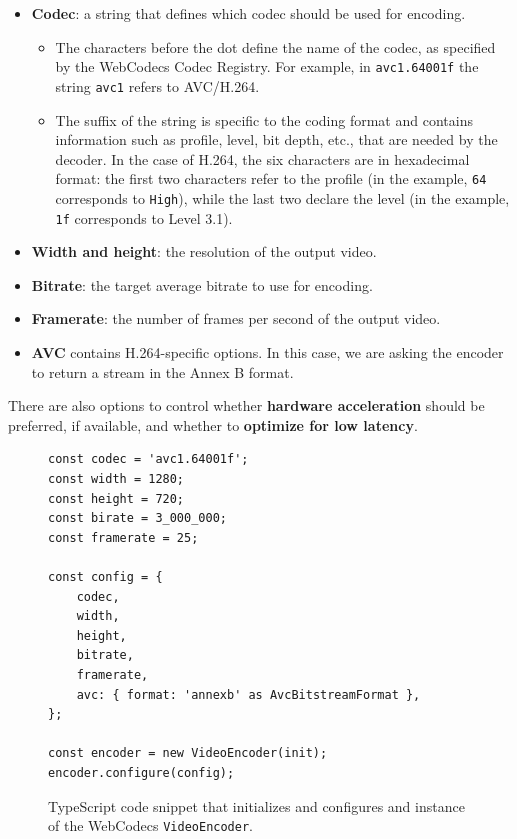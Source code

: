 \begin{itemize}
    \item \textbf{Codec}: a string that defines which codec should be used for encoding.
    \begin{itemize}
        \item The characters before the dot define the name of the codec, as specified by the WebCodecs Codec Registry.\cite{webcodecs_registry} For example, in \texttt{avc1.64001f} the string \texttt{avc1} refers to AVC/H.264.
        \item The suffix of the string is specific to the coding format and contains information such as profile, level, bit depth, etc., that are needed by the decoder. In the case of H.264, the six characters are in hexadecimal format: the first two characters refer to the profile (in the example, \texttt{64} corresponds to \texttt{High}), while the last two declare the level (in the example, \texttt{1f} corresponds to Level 3.1).
    \end{itemize}
    \item \textbf{Width and height}: the resolution of the output video.
    \item \textbf{Bitrate}: the target average bitrate to use for encoding.
    \item \textbf{Framerate}: the number of frames per second of the output video.
    \item \textbf{AVC} contains H.264-specific options. In this case, we are asking the encoder to return a stream in the Annex B format.
\end{itemize}

There are also options to control whether \textbf{hardware acceleration} should be preferred, if available, and whether to \textbf{optimize for low latency}.

\begin{figure}
    \centering
    \begin{verbatim}
const codec = 'avc1.64001f';
const width = 1280;
const height = 720;
const birate = 3_000_000;
const framerate = 25;

const config = {
    codec,
    width,
    height,
    bitrate,
    framerate,
    avc: { format: 'annexb' as AvcBitstreamFormat },
};

const encoder = new VideoEncoder(init);
encoder.configure(config);
\end{verbatim}
    \caption{TypeScript code snippet that initializes and configures and instance of the WebCodecs \texttt{VideoEncoder}.}
    \label{fig:webcodecs_videoencoder}
\end{figure}

